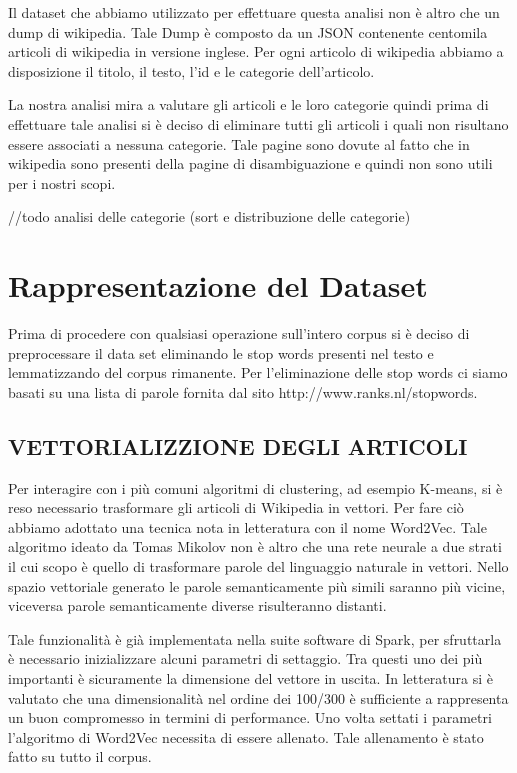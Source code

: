 \documentclass[
12pt, %
a4paper, %
oneside, %
headinclude,footinclude, %
BCOR5mm, %
]{scrartcl}
\begin{document}
Il dataset che abbiamo utilizzato per effettuare questa analisi non è altro che un dump di wikipedia.
Tale Dump è composto da un JSON contenente centomila articoli di wikipedia in versione inglese. Per ogni articolo di
wikipedia abbiamo a disposizione il titolo, il testo, l'id e le categorie dell'articolo.

La nostra analisi mira a valutare gli articoli e le loro categorie quindi prima di effettuare
tale analisi si è deciso di eliminare tutti gli articoli i quali non risultano essere associati a
nessuna categorie. Tale pagine sono dovute al fatto che in wikipedia sono presenti della pagine di
disambiguazione e quindi non sono utili per i nostri scopi.

//todo analisi delle categorie (sort e distribuzione delle categorie)

\section{Rappresentazione del Dataset}

	Prima di procedere con qualsiasi operazione sull'intero corpus si è deciso di preprocessare il data set
    eliminando le stop words presenti nel testo e lemmatizzando del corpus rimanente. Per l'eliminazione delle
    stop words ci siamo basati su una lista di parole fornita dal sito http://www.ranks.nl/stopwords.

	\subsection{VETTORIALIZZIONE DEGLI ARTICOLI}


        Per interagire con i più comuni algoritmi di clustering, ad esempio K-means, si è reso necessario trasformare
        gli articoli di Wikipedia in vettori.
        Per fare ciò abbiamo adottato una tecnica nota in letteratura con il nome Word2Vec. Tale algoritmo ideato da
        Tomas Mikolov non è altro che una rete neurale a due strati il cui scopo è quello di trasformare parole del
        linguaggio naturale in vettori. Nello spazio vettoriale generato le parole semanticamente più simili
        saranno più vicine, viceversa parole semanticamente diverse risulteranno distanti.

        Tale funzionalità è già implementata nella suite software di Spark,
        per sfruttarla è necessario inizializzare alcuni parametri di settaggio. Tra questi uno dei più importanti
        è sicuramente la dimensione del vettore in uscita. In letteratura si è valutato che una dimensionalità
        nel ordine dei 100/300 \cite{w2vdim}
        è sufficiente a rappresenta un buon compromesso in termini di performance.
        Uno volta settati i parametri l'algoritmo di Word2Vec necessita di essere allenato. Tale allenamento è stato
        fatto su tutto il corpus.
\end{document}

